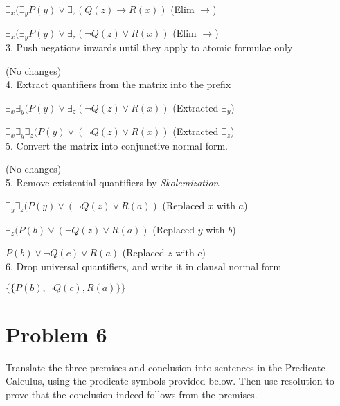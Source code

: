 \documentclass{article}
\newcommand{\tOne}{7.5cm}
\begin{document}
{$\exists_x(\exists_yP(y) \vee \exists_z(Q(z) \rightarrow R(x))$ \tabto{\tOne}(Elim $\rightarrow$)

$\exists_x(\exists_yP(y) \vee \exists_z(\neg{Q(z)} \vee R(x))$ \tabto{\tOne}(Elim $\rightarrow$)\\

3. Push negations inwards until they apply to atomic formulae only

(No changes)\\

4. Extract quantifiers from the matrix into the prefix

$\exists_x\exists_y(P(y) \vee \exists_z(\neg{Q(z)} \vee R(x))$ \tabto{\tOne}(Extracted $\exists_y$)

$\exists_x\exists_y\exists_z(P(y) \vee (\neg{Q(z)} \vee R(x))$ \tabto{\tOne}(Extracted $\exists_z$)\\

5. Convert the matrix into conjunctive normal form.

(No changes)\\

5. Remove existential quantifiers by \emph{Skolemization}.

$\exists_y\exists_z(P(y) \vee (\neg{Q(z)} \vee R(a))$ \tabto{\tOne}(Replaced $x$ with $a$)

$\exists_z(P(b) \vee (\neg{Q(z)} \vee R(a))$ \tabto{\tOne}(Replaced $y$ with $b$)

$P(b) \vee \neg{Q(c)} \vee R(a)$ \tabto{\tOne}(Replaced $z$ with $c$)\\

6. Drop universal quantifiers, and write it in clausal normal form

$\{\{P(b), \neg{Q(c)}, R(a)\}\}$

\pagebreak

\pagebreak
\section*{Problem 6}

Translate the three premises and conclusion into sentences in the Predicate Calculus, using the predicate symbols provided below. Then use resolution to prove that the conclusion indeed follows from the premises.\\

}
\end{document}
